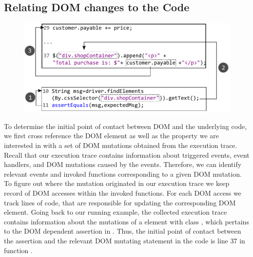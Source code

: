 \subsection{Relating DOM changes to the \javascript Code} \label{Sec:domToCode}

\begin{figure}[!t]
  \centering
  \includegraphics[width=1\hsize]{fig/assertionToCode}
  \vspace{-0.1in} 
  \label{Fig:assertionToCode}
  \vspace{-0.1in} 
\end{figure}
To determine the initial point of contact between DOM and the underlying \javascript code, we first cross reference the DOM element as well as the property we are interested in with a set of DOM mutations obtained from the execution trace. Recall that our execution trace contains information about triggered events, event handlers, and DOM mutations caused by the events. Therefore, we can identify relevant events and invoked functions corresponding to a given DOM mutation. To figure out where the mutation originated in our execution trace we keep record of DOM accesses within the invoked functions. For each DOM access we track \javascript lines of code, that are responsible for updating the corresponding DOM element.
Going back to our running example, the collected execution trace contains information about the mutations of a  element with class , which pertains to the DOM dependent assertion in . Thus, the initial point of contact between the assertion and the relevant DOM mutating statement in the \javascript code is line 37 in function .

